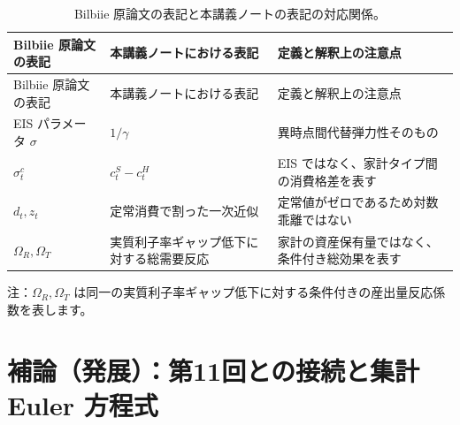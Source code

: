 \documentclass[
  japanese,
  lualatex,
  ja=standard,
  12pt,
  a4paper]{ltjsarticle}
\begin{document}
\begin{longtable}[]{@{}
  >{\raggedright\arraybackslash}p{}
  >{\raggedright\arraybackslash}p{}
  >{\raggedright\arraybackslash}p{}@{}}
\caption{Bilbiie
原論文の表記と本講義ノートの表記の対応関係。}\label{tbl-bilbiie-notation}\tabularnewline
\toprule\noalign{}
\begin{minipage}[b]{\linewidth}\raggedright
Bilbiie 原論文の表記
\end{minipage} & \begin{minipage}[b]{\linewidth}\raggedright
本講義ノートにおける表記
\end{minipage} & \begin{minipage}[b]{\linewidth}\raggedright
定義と解釈上の注意点
\end{minipage} \\
\midrule\noalign{}
\endfirsthead
\toprule\noalign{}
\begin{minipage}[b]{\linewidth}\raggedright
Bilbiie 原論文の表記
\end{minipage} & \begin{minipage}[b]{\linewidth}\raggedright
本講義ノートにおける表記
\end{minipage} & \begin{minipage}[b]{\linewidth}\raggedright
定義と解釈上の注意点
\end{minipage} \\
\midrule\noalign{}
\endhead
\bottomrule\noalign{}
\endlastfoot
EIS パラメータ \(\sigma\) & \(1/\gamma\) & 異時点間代替弾力性そのもの \\
\(\sigma_t^c\) & \(c_t^S - c_t^H\) & EIS
ではなく、家計タイプ間の消費格差を表す \\
\(d_t, z_t\) & 定常消費で割った一次近似 &
定常値がゼロであるため対数乖離ではない \\
\(\Omega_R, \Omega_T\) & 実質利子率ギャップ低下に対する総需要反応 &
家計の資産保有量ではなく、条件付き総効果を表す \\
\end{longtable}

注：\(\Omega_R, \Omega_T\)
は同一の実質利子率ギャップ低下に対する条件付きの産出量反応係数を表します。

\section{補論（発展）：第11回との接続と集計 Euler
方程式}\label{ux88dcux8ad6ux767aux5c55ux7b2c11ux56deux3068ux306eux63a5ux7d9aux3068ux96c6ux8a08-euler-ux65b9ux7a0bux5f0f}
\end{document}
